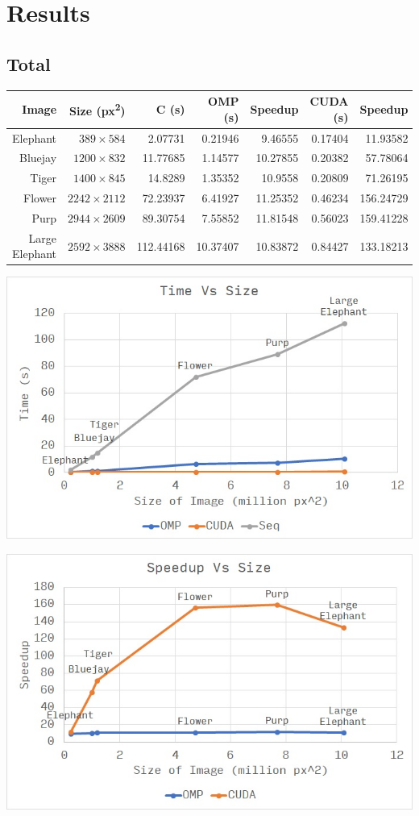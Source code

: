 \documentclass[12pt]{article}
\begin{document}
\section{Results}

\subsection{Total}
\begin{tabular}{r|r|r|r|r|r|r}
    Image & Size (px\textsuperscript{2}) & C (s) & OMP (s) & Speedup & CUDA (s) & Speedup
\\  \hline
    Elephant & $389 \times 584$ & 2.07731 & 0.21946 & 9.46555 & 0.17404 & 11.93582
\\  Bluejay & $1200 \times 832$ & 11.77685 & 1.14577 & 10.27855 & 0.20382 & 57.78064
\\  Tiger & $1400 \times 845$ & 14.8289 & 1.35352 & 10.9558 & 0.20809 & 71.26195
\\  Flower & $2242 \times 2112$ & 72.23937 & 6.41927 & 11.25352 & 0.46234 & 156.24729
\\  Purp & $2944 \times 2609$ & 89.30754 & 7.55852 & 11.81548 & 0.56023 & 159.41228
\\  Large Elephant & $2592 \times 3888$  & 112.44168 & 10.37407 & 10.83872 & 0.84427 & 133.18213
\end{tabular}

\begin{center}
\includegraphics[scale=1]{time.jpg}
\end{center}

\begin{center}
\includegraphics[scale=1]{speedup.jpg}
\end{center}
\end{document}
